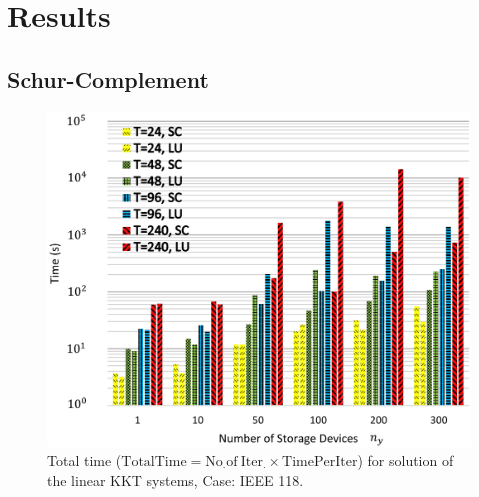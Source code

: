\documentclass{beamer}
\begin{document}
\section{Results}
\subsection{Schur-Complement}
\begin{frame}
\begin{figure}[!htbp]
\centering
\includegraphics[width=3.0 in , height=2.5 in]{Figures/SCLU118Bus.png}
\caption{Total time ($\mathrm{TotalTime= No_{\cdot} of \ Iter_{\cdot} \times TimePerIter}$) for solution of the linear KKT systems, Case: IEEE 118.}
\label{118bus}
\end{figure}
\end{frame}

\end{document}
